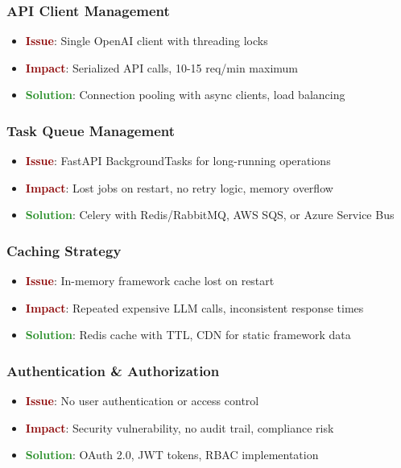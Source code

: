 \documentclass[12pt,a4paper]{report}
\begin{document}
\subsubsection{API Client Management}
\begin{itemize}
    \item \textcolor{darkred}{\textbf{Issue}}: Single OpenAI client with threading locks
    \item \textcolor{darkred}{\textbf{Impact}}: Serialized API calls, 10-15 req/min maximum
    \item \textcolor{forestgreen}{\textbf{Solution}}: Connection pooling with async clients, load balancing
\end{itemize}

\subsubsection{Task Queue Management}
\begin{itemize}
    \item \textcolor{darkred}{\textbf{Issue}}: FastAPI BackgroundTasks for long-running operations
    \item \textcolor{darkred}{\textbf{Impact}}: Lost jobs on restart, no retry logic, memory overflow
    \item \textcolor{forestgreen}{\textbf{Solution}}: Celery with Redis/RabbitMQ, AWS SQS, or Azure Service Bus
\end{itemize}

\subsubsection{Caching Strategy}
\begin{itemize}
    \item \textcolor{darkred}{\textbf{Issue}}: In-memory framework cache lost on restart
    \item \textcolor{darkred}{\textbf{Impact}}: Repeated expensive LLM calls, inconsistent response times
    \item \textcolor{forestgreen}{\textbf{Solution}}: Redis cache with TTL, CDN for static framework data
\end{itemize}

\subsubsection{Authentication \& Authorization}
\begin{itemize}
    \item \textcolor{darkred}{\textbf{Issue}}: No user authentication or access control
    \item \textcolor{darkred}{\textbf{Impact}}: Security vulnerability, no audit trail, compliance risk
    \item \textcolor{forestgreen}{\textbf{Solution}}: OAuth 2.0, JWT tokens, RBAC implementation
\end{itemize}
\end{document}
